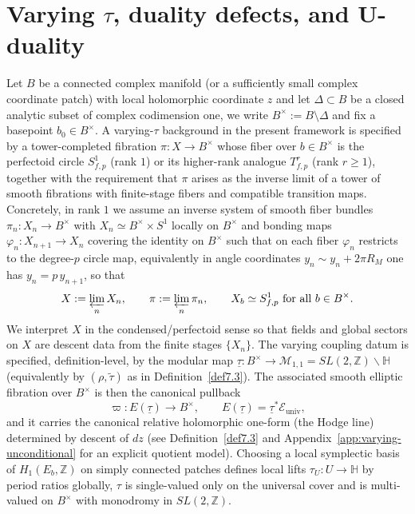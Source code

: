 \documentclass[11pt]{article}
\theoremstyle{remark}
\begin{document}
\section{
Varying \texorpdfstring{\(\tau\)}{tau}, duality defects, and U-duality
}
\label{sec:beyondII}

Let $B$ be a connected complex manifold (or a sufficiently small complex coordinate patch) with local holomorphic coordinate $z$ and let $\Delta\subset B$ be a closed analytic subset of complex codimension one, we write $B^\times:=B\setminus\Delta$ and fix a basepoint $b_0\in B^\times$. A varying-$\tau$ background in the present framework is specified by a tower-completed fibration $\pi:X\to B^\times$ whose fiber over $b\in B^\times$ is the perfectoid circle $S^1_{f,p}$ (rank $1$) or its higher-rank analogue $T^r_{f,p}$ (rank $r\ge 1$), together with the requirement that $\pi$ arises as the inverse limit of a tower of smooth fibrations with finite-stage fibers and compatible transition maps. Concretely, in rank $1$ we assume an inverse system of smooth fiber bundles $\pi_n:X_n\to B^\times$ with $X_n\simeq B^\times\times S^1$ locally on $B^\times$ and bonding maps $\varphi_n:X_{n+1}\to X_n$ covering the identity on $B^\times$ such that on each fiber $\varphi_n$ restricts to the degree-$p$ circle map, equivalently in angle coordinates $y_n\sim y_n+2\pi R_M$ one has $y_n=p\,y_{n+1}$, so that
\begin{equation}\label{eq:tower_fibration}
X:=\varprojlim_n X_n,\qquad \pi:=\varprojlim_n \pi_n,\qquad X_b\simeq S^1_{f,p}\ \text{for all}\ b\in B^\times.
\end{equation}
We interpret $X$ in the condensed/perfectoid sense so that fields and global
sectors on $X$ are descent data from the finite stages $\{X_n\}$. The varying
coupling datum is specified, definition-level, by the modular map
$\underline{\tau}  : B^{\times} \to \mathcal{M}_{1,1}
= SL(2,\mathbb{Z}) \backslash \mathbb{H}$
(equivalently by $(\rho,\widetilde{\tau})$ as in Definition~\eqref{def7.3}). The associated
smooth elliptic fibration over $B^{\times}$ is then the canonical pullback
\begin{equation}\label{eq:E-of-tau}
\varpi  : E(\underline{\tau}) \to B^{\times},
\qquad
E(\underline{\tau}) = \underline{\tau}^{*}\mathcal{E}_{\mathrm{univ}},
\end{equation}
and it carries the canonical relative holomorphic one-form (the Hodge line)
determined by descent of $dz$ (see Definition~\eqref{def7.3} and Appendix~\eqref{app:varying-unconditional} for an explicit
quotient model). Choosing a local symplectic basis of
$H_{1}(E_{b},\mathbb{Z})$ on simply connected patches defines local lifts
$\tau_{U}  : U \to \mathbb{H}$ by period ratios globally, $\tau$ is single-valued
only on the universal cover and is multi-valued on $B^{\times}$ with monodromy
in $SL(2,\mathbb{Z})$.
\end{document}
